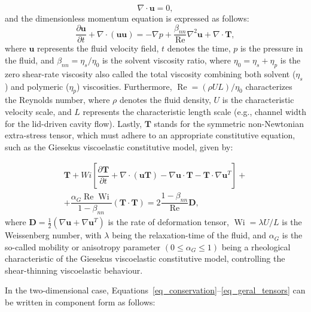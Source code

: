 \documentclass[preprint, 12pt]{elsarticle}
\begin{document}
\begin{equation}
    \nabla\cdot\mathbf{u} = 0,\label{eq_conservation}
\end{equation}
and the dimensionless momentum equation is expressed as follows:
\begin{equation}
    \dfrac{\partial\mathbf{u}}{\partial t} + \nabla\cdot(\mathbf{uu}) = -\nabla p + \dfrac{\beta_{nn}}{\operatorname{Re}}\nabla^{2}\mathbf{u} + \nabla\cdot\mathbf{T},\label{eq_momentun}
\end{equation}
where $\mathbf{u}$ represents the fluid velocity field, $t$ denotes the time,
$p$ is the pressure in the fluid, and $\beta_{nn} = \eta_{s}/\eta_{0}$ is the
solvent viscosity ratio, where $\eta_{0} = \eta_{s} + \eta_{p}$ is the zero
shear-rate viscosity also called the total viscosity combining both solvent
($\eta_{s}$) and polymeric ($\eta_{p}$) viscosities. Furthermore,
$\operatorname{Re} = (\rho U L)/\eta_{0}$ characterizes the Reynolds number,
where $\rho$ denotes the fluid density, $U$ is the characteristic velocity
scale, and $L$ represents the characteristic length scale (e.g., channel width
for the lid-driven cavity flow). Lastly, $\mathbf{T}$ stands for the symmetric
non-Newtonian extra-stress tensor, which must adhere to an appropriate
constitutive equation, such as the Giesekus viscoelastic constitutive model,
given by:

\begin{align}
    \mathbf{T} + Wi\left[ \dfrac{\partial\mathbf{T}}{\partial t} + \nabla\cdot(\mathbf{uT}) - \nabla\mathbf{u}\cdot\mathbf{T} - \mathbf{T}\cdot\nabla\mathbf{u}^{T} \right] 
    + \nonumber\\ + \dfrac{\alpha_{G}\operatorname{Re}\operatorname{Wi}}{1-\beta_{nn}}\left( \mathbf{T}\cdot\mathbf{T} \right) = 2\dfrac{1-\beta_{nn}}{\operatorname{Re}}\mathbf{D},\label{eq_geral_tensors}
\end{align}
where $\mathbf{D} = \frac{1}{2}\left( \nabla\mathbf{u} + \nabla\mathbf{u}^{T}
\right)$ is the rate of deformation tensor, $\operatorname{Wi} = \lambda U / L$
is the Weissenberg number, with $\lambda$ being the relaxation-time of the
fluid, and $\alpha_{G}$ is the so-called mobility or anisotropy parameter
$(0\leq \alpha_{G}\leq 1)$ being a rheological characteristic of the Giesekus
viscoelastic constitutive model, controlling the shear-thinning viscoelastic
behaviour.

In the two-dimensional case,
Equations~\eqref{eq_conservation}--\eqref{eq_geral_tensors} can be written in
component form as follows:
\end{document}
